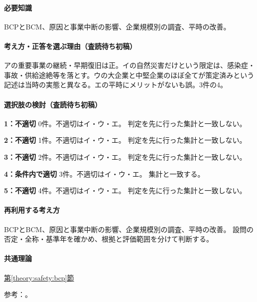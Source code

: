 \paragraph{必要知識} BCPとBCM、原因と事業中断の影響、企業規模別の調査、平時の改善。

\paragraph{考え方・正答を選ぶ理由（査読待ち初稿）} アの重要事業の継続・早期復旧は正。イの自然災害だけという限定は、感染症・事故・供給途絶等を落とす。ウの大企業と中堅企業のほぼ全てが策定済みという記述は当時の実態と異なる。エの平時にメリットがないも誤。3件の4。

\paragraph{選択肢の検討（査読待ち初稿）}\mbox{}\par

\noindent\textbf{1：不適切} 0件。不適切はイ・ウ・エ。 判定を先に行った集計と一致しない。\par

\noindent\textbf{2：不適切} 1件。不適切はイ・ウ・エ。 判定を先に行った集計と一致しない。\par

\noindent\textbf{3：不適切} 2件。不適切はイ・ウ・エ。 判定を先に行った集計と一致しない。\par

\noindent\textbf{4：条件内で適切} 3件。不適切はイ・ウ・エ。 集計と一致する。\par

\noindent\textbf{5：不適切} 4件。不適切はイ・ウ・エ。 判定を先に行った集計と一致しない。\par

\paragraph{再利用する考え方} BCPとBCM、原因と事業中断の影響、企業規模別の調査、平時の改善。 設問の否定・全称・基準年を確かめ、根拠と評価範囲を分けて判断する。

\paragraph{共通理論} \hyperref[theory:safety:bcp]{第\ref*{theory:safety:bcp}節}

\par 参考：\cite{eth54_bcp2013,eth54_bcp_survey2018}。

